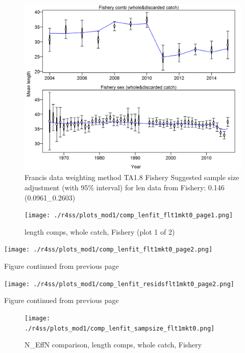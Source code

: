 \documentclass[12pt,]{article}
\begin{document}
\begin{figure}
\centering
\includegraphics{./r4ss/plots_mod1/comp_lenfit_data_weighting_TA1.8_Fishery.png}
\caption{Francis data weighting method TA1.8 Fishery Suggested sample
size adjustment (with 95\% interval) for len data from Fishery: 0.146
(0.0961\_0.2603)
\label{fig:mod1_4_comp_lenfit_data_weighting_TA1.8_Fishery}}
\end{figure}

\begin{figure}
\centering
\texttt{[image: ./r4ss/plots\_mod1/comp\_lenfit\_flt1mkt0\_page1.png]}
\caption{length comps, whole catch, Fishery (plot 1 of 2)
\label{fig:mod1_5_comp_lenfit_flt1mkt0_page1}}
\end{figure}

\texttt{[image: ./r4ss/plots\_mod1/comp\_lenfit\_flt1mkt0\_page2.png]}

\begin{center} 

              Figure continued from previous page 

             \end{center}

\texttt{[image: ./r4ss/plots\_mod1/comp\_lenfit\_residsflt1mkt0\_page2.png]}

\begin{center} 

              Figure continued from previous page 

             \end{center}

\begin{figure}
\centering
\texttt{[image: ./r4ss/plots\_mod1/comp\_lenfit\_sampsize\_flt1mkt0.png]}
\caption{N\_EffN comparison, length comps, whole catch, Fishery
\label{fig:mod1_8_comp_lenfit_sampsize_flt1mkt0}}
\end{figure}
\end{document}
